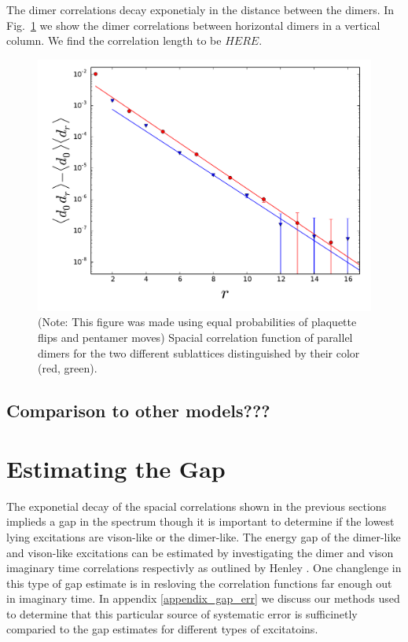 \documentclass[twocolumn,prb,aps,floatfix,superscriptaddress]{revtex4-1}
\begin{document}
    The dimer correlations decay exponetialy in the distance between the dimers. 
    In Fig.~\ref{fig:spacial_dmr_cor} we show the dimer correlations between horizontal dimers
    in a vertical column. We find the correlation length to be $HERE$.
    \begin{figure}[htpb]
        \centering
        \includegraphics[width=0.8\linewidth]{spacial_dmr_cor.pdf}
        \caption{(Note: This figure was made using equal probabilities of plaquette flips and
        pentamer moves) Spacial correlation function of parallel dimers for the two different
        sublattices distinguished by their color (red, green).}
        \label{fig:spacial_dmr_cor}
    \end{figure}

    \subsection{Comparison to other models???}

\section{Estimating the Gap}
    The exponetial decay of the spacial correlations shown in the previous sections 
    implieds a gap in the spectrum though it is important to determine if the lowest lying
    excitations are vison-like
    or the dimer-like.  The energy gap of the dimer-like and vison-like excitations can be estimated 
    by investigating the dimer and
    vison imaginary time correlations respectivly as outlined by Henley \cite{Henley2004a}. 
    One changlenge in this type of gap estimate is in resloving the correlation functions far enough out
    in imaginary time. In appendix \ref{appendix_gap_err} we discuss our methods used to determine
    that this particular source of systematic error is sufficinetly comparied to the gap
    estimates for different types of excitatoins.
\end{document}
